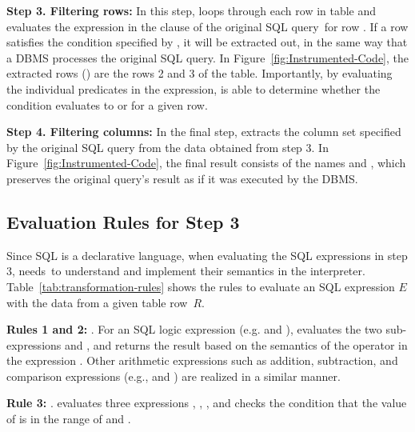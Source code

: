\vspace{0.04in}
\textbf{Step 3. Filtering rows:} In this step, \tool{} loops through
each row  in table  and evaluates the expression
 in the  clause of the original SQL query~for row .
If a row  satisfies the condition specified
by , it will be extracted out, in the same way that a
DBMS processes the original SQL query. In
Figure~\ref{fig:Instrumented-Code}, the extracted rows
() are the rows 2 and 3 of the 
table. Importantly, by evaluating the individual predicates in the
 expression, \tool{} is able to determine whether the
 condition evaluates to  or  for a
given row.

\vspace{0.04in}
\textbf{Step 4. Filtering columns:} In the final step, \tool{}
extracts the column set specified by the original SQL query from the
data obtained from step 3. In Figure~\ref{fig:Instrumented-Code}, the
final result consists of the names  and ,
which preserves the original query's result as if it was executed by
the DBMS.


\subsection{Evaluation Rules for Step 3}

Since SQL is a declarative language, when evaluating the SQL
expressions in step 3, \tool{} needs~to understand and implement their
semantics in the interpreter. Table~\ref{tab:transformation-rules}
shows the rules to evaluate an SQL expression $E$ with the data from a
given table row~$R$.



\textbf{Rules 1 and 2:}
. For an SQL logic expression (e.g. 
and ), \tool{} evaluates the two sub-expressions
 and , and returns the result based on the semantics
of the operator in the expression . Other arithmetic
expressions such as addition, subtraction, and comparison expressions
(e.g.,  and ) are realized in a similar
manner.

\textbf{Rule 3:} . \tool{}
evaluates three expressions , , , and
checks the condition that the value of  is in the
range of  and .

